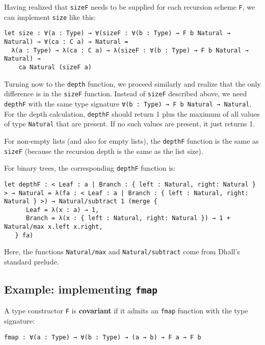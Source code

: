 Having realized that \lstinline!sizeF! needs to be supplied for each recursion scheme \lstinline!F!, we can implement \lstinline!size! like this:


\begin{lstlisting}[language=Dhall]
let size : ∀(a : Type) → ∀(sizeF : ∀(b : Type) → F b Natural → Natural) → ∀(ca : C a) → Natural =
  λ(a : Type) → λ(ca : C a) → λ(sizeF : ∀(b : Type) → F b Natural → Natural) →
    ca Natural (sizeF a)
\end{lstlisting}


Turning now to the \lstinline!depth! function, we proceed similarly and realize that the only difference is in the \lstinline!sizeF! function.
Instead of \lstinline!sizeF! described above, we need \lstinline!depthF! with the same type signature \lstinline!∀(b : Type) → F b Natural → Natural!.
For the depth calculation, \lstinline!depthF! should return 1 plus the maximum of all values of type \lstinline!Natural! that are present. If no such values are present, it just
returns 1.


For non-empty lists (and also for empty lists), the \lstinline!depthF! function is the same as \lstinline!sizeF! (because the recursion depth is the same as the list size).


For binary trees, the corresponding \lstinline!depthF! function is:


\begin{lstlisting}[language=Dhall]
let depthF : < Leaf : a | Branch : { left : Natural, right: Natural } > → Natural = λ(fa : < Leaf : a | Branch : { left : Natural, right: Natural } >) → Natural/subtract 1 (merge {
      Leaf = λ(x : a) → 1,
      Branch = λ(x : { left : Natural, right: Natural }) → 1 + Natural/max x.left x.right,
   } fa)
\end{lstlisting}


Here, the functions \lstinline!Natural/max! and \lstinline!Natural/subtract! come from Dhall's standard prelude.


\subsection{Example: implementing \lstinline!fmap!}


A type constructor \lstinline!F! is \textbf{covariant} if it admits an \lstinline!fmap! function with the type signature:


\begin{lstlisting}[language=Dhall]
fmap : ∀(a : Type) → ∀(b : Type) → (a → b) → F a → F b
\end{lstlisting}


